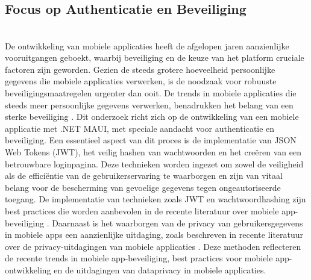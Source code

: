 \chapter{}%
\label{ch:stand-van-zaken}


\section{Focus op Authenticatie en Beveiliging}\\

De ontwikkeling van mobiele applicaties heeft de afgelopen jaren aanzienlijke vooruitgangen geboekt, waarbij beveiliging en de keuze van het platform cruciale factoren zijn geworden. Gezien de steeds grotere hoeveelheid persoonlijke gegevens die mobiele applicaties verwerken, is de noodzaak voor robuuste beveiligingsmaatregelen urgenter dan ooit. De trends in mobiele applicaties die steeds meer persoonlijke gegevens verwerken, benadrukken het belang van een sterke beveiliging \autocite{build382022}. Dit onderzoek richt zich op de ontwikkeling van een mobiele applicatie met .NET MAUI, met speciale aandacht voor authenticatie en beveiliging. Een essentieel aspect van dit proces is de implementatie van JSON Web Tokens (JWT), het veilig hashen van wachtwoorden en het creëren van een betrouwbare loginpagina. Deze technieken worden ingezet om zowel de veiligheid als de efficiëntie van de gebruikerservaring te waarborgen en zijn van vitaal belang voor de bescherming van gevoelige gegevens tegen ongeautoriseerde toegang. De implementatie van technieken zoals JWT en wachtwoordhashing zijn best practices die worden aanbevolen in de recente literatuur over mobiele app-beveiliging \autocite{AndrewMakarov}. Daarnaast is het waarborgen van de privacy van gebruikersgegevens in mobiele apps een aanzienlijke uitdaging, zoals beschreven in recente literatuur over de privacy-uitdagingen van mobiele applicaties \autocite{Cybersecurity2018}. Deze methoden reflecteren de recente trends in mobiele app-beveiliging, best practices voor mobiele app-ontwikkeling en de uitdagingen van dataprivacy in mobiele applicaties. \\

